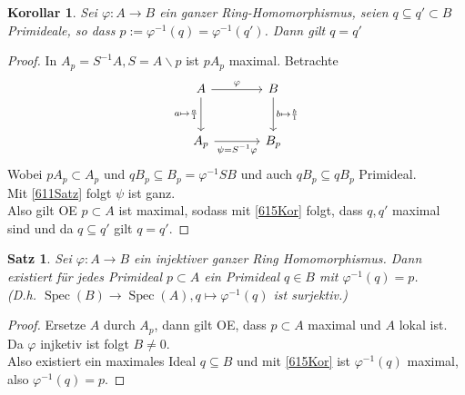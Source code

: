 \documentclass[10pt,a4paper]{article}
\newcommand{\Spec}{\ensuremath{\operatorname{Spec}}}
\newcounter{thm}[section]
\theoremstyle{definition}
\theoremstyle{plain}
\newtheorem{kor}[thm]{Korollar}
\newtheorem{satz}[thm]{Satz}
\theoremstyle{remark}
\begin{document}
\begin{kor}
	Sei $\varphi:A\rightarrow B$ ein ganzer Ring-Homomorphismus, seien $q\subseteq q'\subset B$ Primideale, so dass $p:=\varphi^{-1}(q)=\varphi^{-1}(q')$. Dann gilt $q=q'$
\end{kor}
\begin{proof}
	In $A_p=S^{-1}A,S=A\backslash p$ ist $pA_p$ maximal. Betrachte
	\[
		\begin{tikzcd}[row sep=large,column sep=large]
		A\ar[r,"\varphi"] \ar[d,"a\mapsto\frac{a}{1}"'] 
			& B \ar[d,"b\mapsto\frac{b}{1}"]\\
		A_p \ar[r,"\psi=S^{-1}\varphi"'] 
			& B_p
		\end{tikzcd}
	\]
	Wobei $pA_p\subset A_p$ und $qB_p\subseteq B_p=\varphi^{-1}SB$ und auch $qB_p\subseteq qB_p$ Primideal.\\
	Mit \ref{611Satz} folgt $\psi$ ist ganz.\\
	Also gilt OE $p\subset A$ ist maximal, sodass mit \ref{615Kor} folgt, dass $q,q'$ maximal sind und da $q\subseteq q'$ gilt $q=q'$.
\end{proof}

\begin{satz}\label{617Satz}
	Sei $\varphi:A\rightarrow B$ ein injektiver ganzer Ring Homomorphismus. Dann existiert für jedes Primideal $p\subset A$ ein Primideal $q\in B$ mit $\varphi^{-1}(q)=p$.\\
	(D.h. $\Spec(B)\rightarrow \Spec(A),q\mapsto \varphi^{-1}(q)$ ist surjektiv.)
\end{satz}
\begin{proof}
	Ersetze $A$ durch $A_p$, dann gilt OE, dass $p\subset A$ maximal und $A$ lokal ist.\\
	Da $\varphi$ injketiv ist folgt $B\neq 0$.\\
	Also existiert ein maximales Ideal $q\subseteq B$ und mit \ref{615Kor} ist $\varphi^{-1}(q)$ maximal, also $\varphi^{-1}(q)=p$.
\end{proof}
\end{document}
